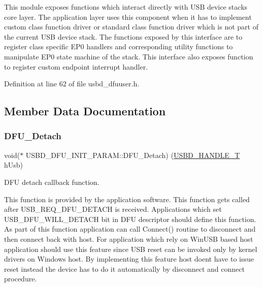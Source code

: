 This module exposes functions which interact directly with U\+SB device stack\textquotesingle{}s core layer. The application layer uses this component when it has to implement custom class function driver or standard class function driver which is not part of the current U\+SB device stack. The functions exposed by this interface are to register class specific E\+P0 handlers and corresponding utility functions to manipulate E\+P0 state machine of the stack. This interface also exposes function to register custom endpoint interrupt handler. 

Definition at line 62 of file usbd\+\_\+dfuuser.\+h.



\subsection{Member Data Documentation}
\mbox{\label{struct_u_s_b_d___d_f_u___i_n_i_t___p_a_r_a_m_ae4467d347854eaab0b352aa5cdef7a74}} 
\subsubsection{\texorpdfstring{D\+F\+U\+\_\+\+Detach}{DFU\_Detach}}
{\footnotesize\ttfamily void($\ast$ U\+S\+B\+D\+\_\+\+D\+F\+U\+\_\+\+I\+N\+I\+T\+\_\+\+P\+A\+R\+A\+M\+::\+D\+F\+U\+\_\+\+Detach) (\hyperlink{group___u_s_b_d___core_gafdbb2204d929cb9d75736bd2b42342ac}{U\+S\+B\+D\+\_\+\+H\+A\+N\+D\+L\+E\+\_\+T} h\+Usb)}

D\+FU detach callback function.

This function is provided by the application software. This function gets called after U\+S\+B\+\_\+\+R\+E\+Q\+\_\+\+D\+F\+U\+\_\+\+D\+E\+T\+A\+CH is received. Applications which set U\+S\+B\+\_\+\+D\+F\+U\+\_\+\+W\+I\+L\+L\+\_\+\+D\+E\+T\+A\+CH bit in D\+FU descriptor should define this function. As part of this function application can call Connect() routine to disconnect and then connect back with host. For application which rely on Win\+U\+SB based host application should use this feature since U\+SB reset can be invoked only by kernel drivers on Windows host. By implementing this feature host doen\textquotesingle{}t have to issue reset instead the device has to do it automatically by disconnect and connect procedure.


